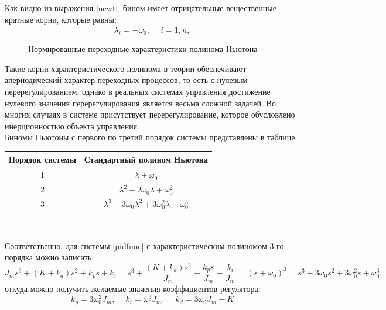 Как видно из выражения \eqref{newt}, бином имеет отрицательные вещественные кратные корни, которые равны:
\begin{equation}
	\lambda_i=-\omega_0, \phantom{-}i=\overline{1,n},
\end{equation}

\begin{figure}[h]
	\noindent{}
	\caption{Нормированные переходные характеристики полинома Ньютона}
	\label{newgraph}
\end{figure}

Такие корни характеристического полинома в теории обеспечивают апериодический характер переходных процессов, то есть с нулевым перерегулированием, однако в реальных системах управления достижение нулевого значения перерегулирования является весьма сложной задачей. Во многих случаях в системе присутствует перерегулирование, которое обусловлено инерционностью объекта управления.\\

Биномы Ньютоны с первого по третий порядок системы представлены в таблице:
\begin{center}
\begin{tabular}{ |c|c| } 
 \hline
 Порядок системы &  Стандартный полином Ньютона \\ 
 \hline
 1 & $\lambda+\omega_0$ \\ 
 \hline
 2 & $\lambda^2+2\omega_0\lambda+\omega_0^2$ \\ 
 \hline
 3 & $\lambda^3+3\omega_0\lambda^2+3\omega_0^2\lambda+\omega_0^3$ \\ 
 \hline
\end{tabular}\\
\end{center}

Соответственно, для системы \eqref{pidfunc} с характеристическим полиномом 3-го порядка можно записать:
\begin{equation}
	J_ms^3+(K+k_d)s^2+k_ps+k_i = s^3+\frac{(K+k_d)s^2}{J_m}+\frac{k_ps}{J_m} +\frac{k_i}{J_m} =(s+\omega_0)^3= s^3+3\omega_0s^2+3\omega_0^2s+\omega_0^3,
\end{equation}
откуда можно получить желаемые значения коэффициентов регулятора:
\begin{equation}
	k_p = 3\omega_0^2J_m, \phantom{- }k_i = \omega_0^3J_m, \phantom{- } k_d=3\omega_0J_m - K
\end{equation}

